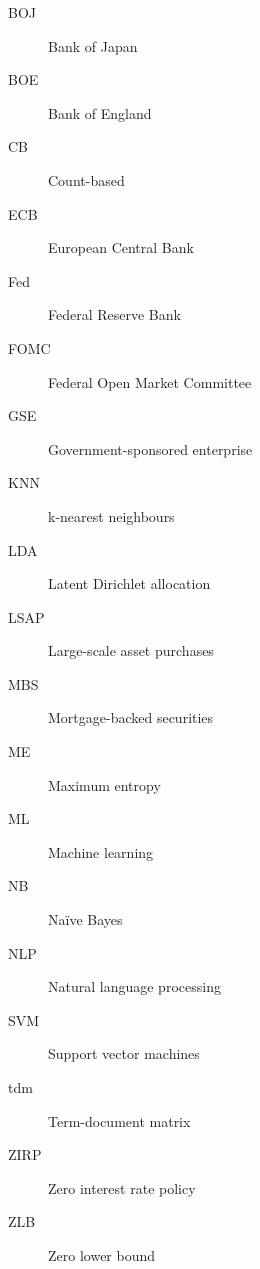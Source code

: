 %
\begin{description}
	\item[BOJ] Bank of Japan
	\item[BOE] Bank of England
	\item[CB] Count-based
	\item[ECB] European Central Bank
	\item[Fed] Federal Reserve Bank
	\item[FOMC] Federal Open Market Committee
	\item[GSE] Government-sponsored enterprise
	\item[KNN] k-nearest neighbours
	\item[LDA] Latent Dirichlet allocation
	\item[LSAP] Large-scale asset purchases
	\item[MBS] Mortgage-backed securities
	\item[ME] Maximum entropy
	\item[ML] Machine learning
	\item[NB] Na\"{i}ve Bayes
	\item[NLP] Natural language processing
	\item[SVM] Support vector machines
	\item[tdm] Term-document matrix
	\item[ZIRP] Zero interest rate policy
	\item[ZLB] Zero lower bound
\end{description}